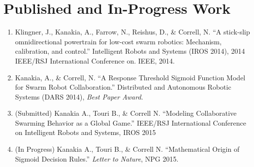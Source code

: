 \documentclass[11pt, onecolumn, compsoc, letterpaper]{article}
\begin{document}
\section{Published and In-Progress Work}
\begin{enumerate}
	\item Klingner, J., Kanakia, A., Farrow, N., Reishus, D., \& Correll, N. ``A stick-slip omnidirectional powertrain for low-cost swarm robotics: Mechanism, calibration, and control.'' Intelligent Robots and Systems (IROS 2014), 2014 IEEE/RSJ International Conference on. IEEE, 2014.
	\item Kanakia, A., \& Correll, N. ``A Response Threshold Sigmoid Function Model for Swarm Robot Collaboration.'' Distributed and Autonomous Robotic Systems (DARS 2014), \emph{Best Paper Award}.
	\item (Submitted) Kanakia A., Touri B., \& Correll N. ``Modeling Collaborative Swarming Behavior as a Global Game.'' IEEE/RSJ International Conference on Intelligent Robots and Systems, IROS 2015
	\item (In Progress) Kanakia A., Touri B., \& Correll N. ``Mathematical Origin of Sigmoid Decision Rules.'' \textit{Letter to Nature}, NPG 2015. 
\end{enumerate}

%


\end{document}
